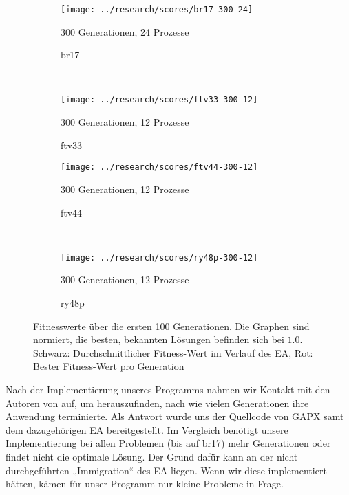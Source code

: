 \begin{figure}[H]
    \centering
    \begin{subfigure}[b]{0.45\textwidth}
      \texttt{[image: ../research/scores/br17-300-24]}
      \caption{br17}
      \begin{center}
        \vskip-10pt
        \small 300 Generationen, 24 Prozesse
      \end{center}
      \label{fig:br17-300-24}
    \end{subfigure}
    ~
    \begin{subfigure}[b]{0.45\textwidth}
      \texttt{[image: ../research/scores/ftv33-300-12]}
      \caption{ftv33}
      \begin{center}
        \vskip-10pt
        \small 300 Generationen, 12 Prozesse
      \end{center}
      \label{fig:ftv33-300-12}
    \end{subfigure}

    \begin{subfigure}[b]{0.45\textwidth}
      \texttt{[image: ../research/scores/ftv44-300-12]}
      \caption{ftv44}
      \begin{center}
        \vskip-10pt
        \small 300 Generationen, 12 Prozesse
      \end{center}
      \label{fig:ftv44-300-12}
    \end{subfigure}
    ~
    \begin{subfigure}[b]{0.45\textwidth}
      \texttt{[image: ../research/scores/ry48p-300-12]}
      \caption{ry48p}
      \begin{center}
      \vskip-10pt
      \small 300 Generationen, 12 Prozesse
      \end{center}
      \label{fig:ry48p-300-12}
    \end{subfigure}
    \caption[Fitnesswerte einiger ATSP-Probleme]{\label{fig:fitness-plots} 
    Fitnesswerte über die ersten 100 Generationen. Die Graphen sind
    normiert, die besten, bekannten Lösungen befinden sich bei $1.0$. Schwarz:
    Durchschnittlicher Fitness-Wert im Verlauf des EA, Rot: Bester
    Fitness-Wert pro Generation}
\end{figure}
\noindent
Nach der Implementierung unseres Programms nahmen wir Kontakt mit den
Autoren von \cite{gapx} auf, um herauszufinden, nach wie vielen
Generationen ihre Anwendung terminierte. Als Antwort wurde uns der
Quellcode von GAPX samt dem dazugehörigen EA bereitgestellt. Im
Vergleich benötigt unsere Implementierung bei allen Problemen (bis auf
br17) mehr Generationen oder findet nicht die optimale Lösung. Der Grund
dafür kann an der nicht durchgeführten „Immigration“ des EA liegen.
Wenn wir diese implementiert hätten, kämen für unser Programm nur kleine
Probleme in Frage.
